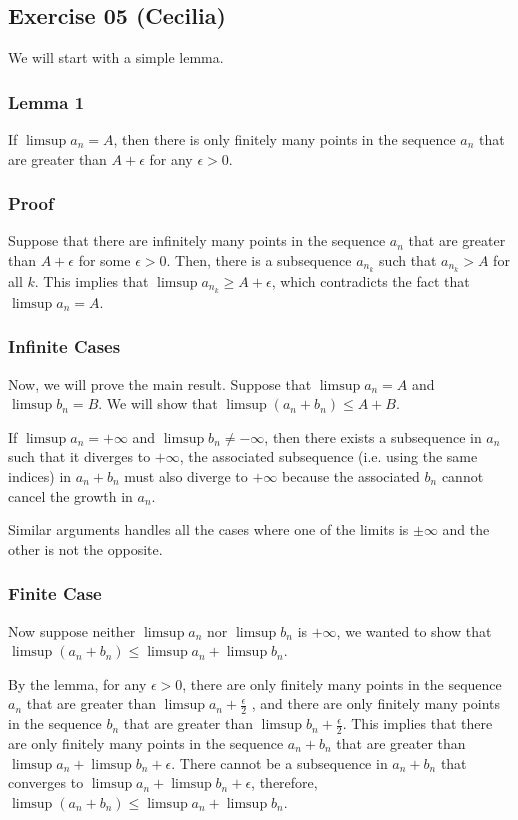 \subsection*{Exercise 05 (Cecilia)}
We will start with a simple lemma.
\subsubsection*{Lemma 1}
If $ \limsup a_n = A $, then there is only finitely many points in the sequence $ a_n $ that are greater than $ A + \epsilon $ for any $ \epsilon > 0 $.
\subsubsection*{Proof}
Suppose that there are infinitely many points in the sequence $ a_n $ that are greater than $ A + \epsilon $ for some $ \epsilon > 0 $. Then, there is a subsequence $ a_{n_k} $ such that $ a_{n_k} > A $ for all $ k $. This implies that $ \limsup a_{n_k} \geq A + \epsilon $, which contradicts the fact that $ \limsup a_n = A $.
\subsubsection*{Infinite Cases}
Now, we will prove the main result. Suppose that $ \limsup a_n = A $ and $ \limsup b_n = B $. We will show that $ \limsup (a_n + b_n) \leq A + B $.

If $ \limsup a_n = +\infty $ and $ \limsup b_n \ne -\infty $, then there exists a subsequence in $ a_n $ such that it diverges to $ +\infty $, the associated subsequence (i.e. using the same indices) in $ a_n + b_n $ must also diverge to $ +\infty $ because the associated $ b_n $ cannot cancel the growth in $ a_n $.

Similar arguments handles all the cases where one of the limits is $ \pm\infty $ and the other is not the opposite.
\subsubsection*{Finite Case}
Now suppose neither $ \limsup a_n $ nor $ \limsup b_n $ is $ +\infty $, we wanted to show that $ \limsup (a_n + b_n) \leq \limsup a_n + \limsup b_n $.

By the lemma, for any $ \epsilon > 0 $, there are only finitely many points in the sequence $ a_n $ that are greater than $ \limsup a_n + \frac{\epsilon}{2} $ , and there are only finitely many points in the sequence $ b_n $ that are greater than $ \limsup b_n + \frac{\epsilon}{2} $. This implies that there are only finitely many points in the sequence $ a_n + b_n $ that are greater than $ \limsup a_n + \limsup b_n + \epsilon $. There cannot be a subsequence in $ a_n + b_n $ that converges to $ \limsup a_n + \limsup b_n + \epsilon $, therefore, $ \limsup (a_n + b_n) \leq \limsup a_n + \limsup b_n $.